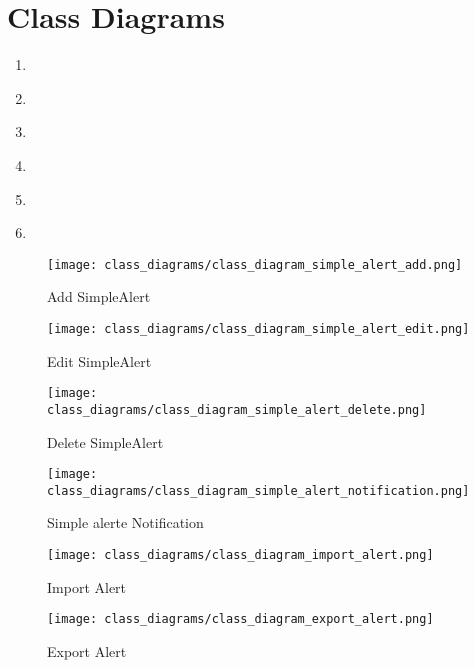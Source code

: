 \chapter{Class Diagrams}\label{ch:class_diagrams}

\begin{enumerate}
    \item~
    \item~
    \item~
    \item~
    \item~
    \item~
\end{enumerate}

\begin{figure}[]
	\centering
    \caption{Add SimpleAlert}\label{fig:cls_simple_alert_add}
    \texttt{[image: class\_diagrams/class\_diagram\_simple\_alert\_add.png]}
\end{figure}

\begin{figure}[]
	\centering
    \caption{Edit SimpleAlert}\label{fig:cls_simple_alert_edit}
    \texttt{[image: class\_diagrams/class\_diagram\_simple\_alert\_edit.png]}
\end{figure}

\begin{figure}[]
	\centering
    \caption{Delete SimpleAlert}\label{fig:cls_simple_alert_delete}
    \texttt{[image: class\_diagrams/class\_diagram\_simple\_alert\_delete.png]}
\end{figure}

\begin{figure}[]
	\centering
    \caption{Simple alerte Notification}\label{fig:cls_simple_alert_notification}
    \texttt{[image: class\_diagrams/class\_diagram\_simple\_alert\_notification.png]}
\end{figure}

\begin{figure}[]
	\centering
    \caption{Import Alert}\label{fig:cls_import_alert}
    \texttt{[image: class\_diagrams/class\_diagram\_import\_alert.png]}
\end{figure}

\begin{figure}[]
	\centering
    \caption{Export Alert}\label{fig:cls_export_alert}
    \texttt{[image: class\_diagrams/class\_diagram\_export\_alert.png]}
\end{figure}
